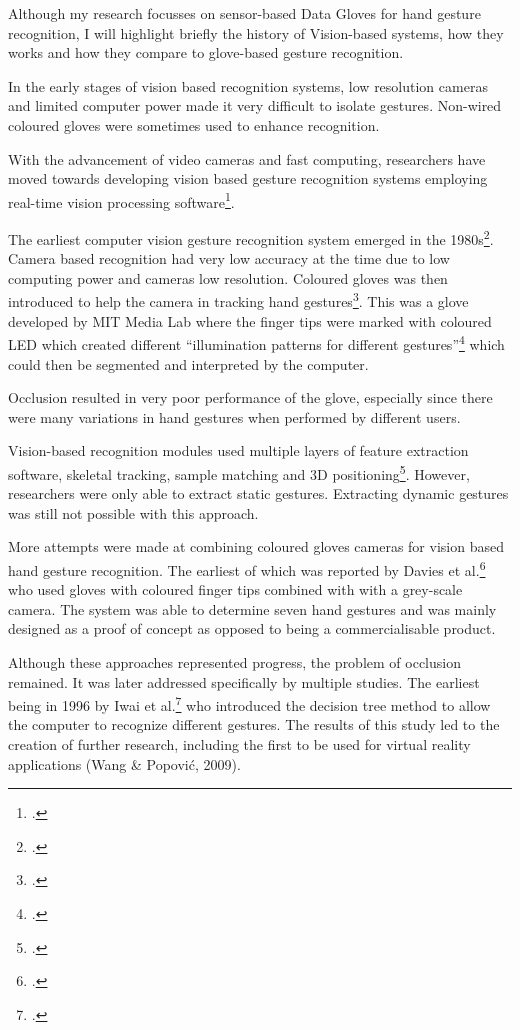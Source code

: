 Although my research focusses on sensor-based Data Gloves for hand gesture recognition, I will highlight briefly the history of Vision-based systems, how they works and how they compare to glove-based gesture recognition.

In the early stages of vision based recognition systems, low resolution cameras and limited computer power made it very difficult to isolate gestures. Non-wired coloured gloves were sometimes used to enhance recognition.

With the advancement of video cameras and fast computing, researchers have moved towards developing vision based gesture recognition systems employing real-time vision processing software\footcite{Pavlovic1997}.

The earliest computer vision gesture recognition system emerged in the 1980s\footcite{Premaratne2010}. Camera based recognition had very low accuracy at the time due to low computing power and cameras low resolution. Coloured gloves was then introduced to help the camera in tracking hand gestures\footcite{James1994}. This was a glove developed by MIT Media Lab where the finger tips were marked with coloured LED which created different ``illumination patterns for different gestures''\footcite{Sturman1994} which could then be segmented and interpreted by the computer. 

Occlusion resulted in very poor performance of the glove, especially since there were many variations in hand gestures when performed by different users. 

Vision-based recognition modules used multiple layers of feature extraction software, skeletal tracking, sample matching and 3D positioning\footcite{Berci2007}. However, researchers were only able to extract static gestures. Extracting dynamic gestures was still not possible with this approach. 

More attempts were made at combining coloured gloves cameras for vision based hand gesture recognition. The earliest of which was reported by Davies et al.\footcite{James1994} who used gloves with coloured finger tips combined with with a grey-scale camera. The system was able to determine seven hand gestures and was mainly designed as a proof of concept as opposed to being a commercialisable product. 

Although these approaches represented progress, the problem of occlusion remained. It was later addressed specifically by multiple studies. The earliest being in 1996 by Iwai et al.\footcite{Iwai1996} who introduced the decision tree method to allow the computer to recognize different gestures. The results of this study led to the creation of further research, including the first to be used for virtual reality applications (Wang & Popović, 2009). 

